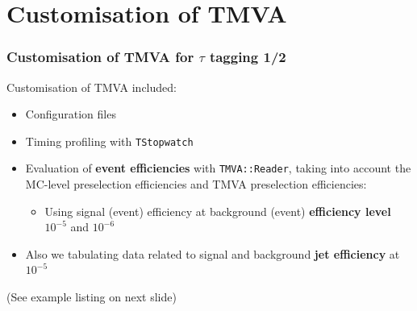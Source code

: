 \section{Customisation of TMVA}
\begin{frame}
\frametitle{Customisation of TMVA for $\tau$ tagging 1/2}
\vspace{0.4cm}
Customisation of TMVA included:
\begin{itemize}
\item Configuration files

\vspace{0.4cm}
\item Timing profiling with {\tt TStopwatch}

\vspace{0.4cm}
\item Evaluation of {\bf event efficiencies} with {\tt TMVA::Reader}, taking into account
   the MC-level preselection efficiencies and TMVA preselection efficiencies:

\begin{itemize}
\vspace{0.4cm}
\item Using signal (event) efficiency at background (event) {\bf efficiency level $10^{-5}$} and $10^{-6}$
\end{itemize}

\vspace{0.4cm}
\item Also we tabulating data related to  signal and background {\bf jet efficiency} at $10^{-5}$
\end{itemize}

\vspace{0.6cm}
{\color{dark-blue}(See example listing on next slide)} 

\end{frame}


